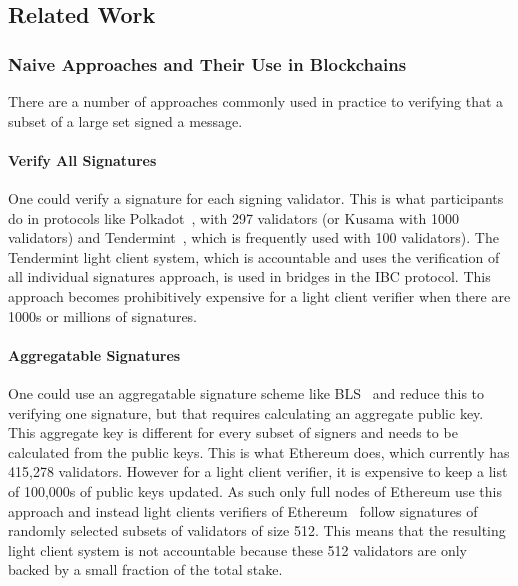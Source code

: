 \vspace{-0.2cm}
\subsection{Related Work}

\subsubsection{Naive Approaches and Their Use in Blockchains}
There are a number of approaches commonly used in practice to verifying that a subset of a large set signed a message. 
\vspace{-0.2cm}
\noindent \paragraph{Verify All Signatures}  One could verify a signature for each signing validator. This is what participants  do in protocols like Polkadot~\cite{polkadot}, with 297 validators
(or Kusama with 1000 validators) %
and Tendermint~\cite{tendermint_paper}, which is frequently used with 100 validators). %
The Tendermint light client system, which is accountable and uses the verification of all individual signatures approach, 
is used in bridges in the IBC protocol\cite{IBC_paper}. This approach becomes prohibitively expensive for a light client verifier when there are 1000s or millions of signatures. 
\vspace{-0.1in}
\noindent \paragraph{Aggregatable Signatures} One could use an aggregatable signature scheme like BLS~\cite{BLS_signatures,boneh_compact_multisig}  and reduce this to verifying one signature, but that requires calculating an aggregate public key. This aggregate key is different for every subset of signers and needs to be calculated from the public keys. This is what Ethereum 
does, which currently has 415,278 validators. %
However for a light client verifier, it is expensive to keep a list of 100,000s of public keys updated. As such only full nodes of Ethereum use this approach and instead light clients verifiers of Ethereum~\cite{sync_committee} follow signatures of randomly selected subsets of validators of size 512. This means that the resulting light client system is not accountable because these 512 validators are only backed by a small fraction of the total stake.
